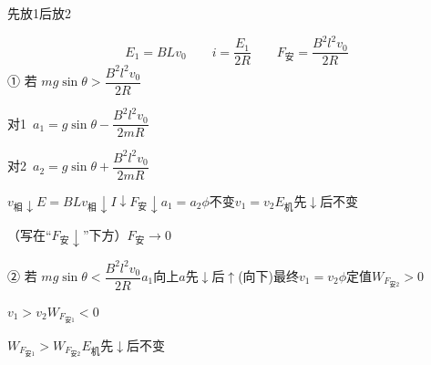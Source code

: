 \begin{problem}
先放1后放2
\begin{solution}
\[ E_1=BLv_0\qquad i=\frac{E_1}{2R}\qquad F_{\text{安}}=\frac{B^2l^2v_0}{2R} \]
① 若 $mg\sin\theta>\dfrac{B^2l^2v_0}{2R}$

\quad 对1\ $a_1=g\sin\theta-\dfrac{B^2l^2v_0}{2mR}$

\quad 对2\ $a_2=g\sin\theta+\dfrac{B^2l^2v_0}{2mR}$

$v_{\text{相}}\downarrow$\quad $E=BLv_{\text{相}}\downarrow$\quad $I\downarrow$\quad $F_{\text{安}}\downarrow$\quad $a_1=a_2$\quad $\phi$不变\quad $v_1=v_2$\quad $E_{\text{机}}$先$\downarrow$后不变

（写在“$F_{\text{安}}\downarrow$”下方）$F_{\text{安}}\to0$

② 若 $mg\sin\theta<\dfrac{B^2l^2v_0}{2R}$\quad $a_1$向上\quad $a$先$\downarrow$后$\uparrow$(向下)\quad 最终$v_1=v_2$\quad $\phi$定值\quad $W_{F_{\text{安}2}}>0$

$v_1>v_2$\quad $W_{F_{\text{安}1}}<0$ %

$W_{F_{\text{安}1}}>W_{F_{\text{安}2}}$\quad $E_{\text{机}}$先$\downarrow$后不变 %
\end{solution}
\end{problem}

